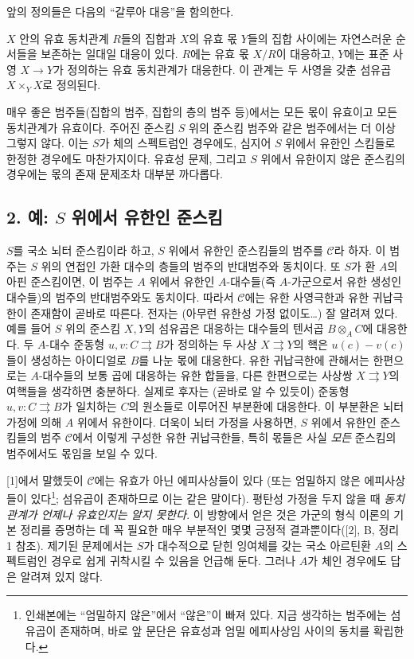 앞의 정의들은 다음의 ``갈루아 대응''을 함의한다.

 $X$ 안의 유효 동치관계 $R$들의 집합과 $X$의 유효
몫 $Y$들의 집합 사이에는 자연스러운 순서들을 보존하는 일대일 대응이
있다. $R$에는 유효 몫 $X/R$이 대응하고, $Y$에는 표준 사영
$X\longrightarrow Y$가 정의하는 유효 동치관계가 대응한다. 이 관계는
두 사영을 갖춘 섬유곱 $X\times_Y X$로 정의된다.

매우 좋은 범주들(집합의 범주, 집합의 층의 범주 등)에서는 모든 몫이
유효이고 모든 동치관계가 유효이다. 주어진 준스킴 $S$ 위의 준스킴
범주와 같은 범주에서는 더 이상 그렇지 않다. 이는 $S$가 체의
스펙트럼인 경우에도, 심지어 $S$ 위에서 유한인 스킴들로 한정한
경우에도 마찬가지이다. 유효성 문제, 그리고 $S$ 위에서 유한이지 않은
준스킴의 경우에는 몫의 존재 문제조차 대부분 까다롭다.

\subsection*{2. 예: $S$ 위에서 유한인 준스킴}

$S$를 국소 뇌터 준스킴이라 하고, $S$ 위에서 유한인 준스킴들의
범주를 $\mathcal C$라 하자. 이 범주는 $S$ 위의 연접인 가환 대수의
층들의 범주의 반대범주와 동치이다. 또 $S$가 환 $A$의 아핀
준스킴이면, 이 범주는 $A$ 위에서 유한인 $A$-대수들(즉 $A$-가군으로서
유한 생성인 대수들)의 범주의 반대범주와도 동치이다. 따라서
$\mathcal C$에는 유한 사영극한과 유한 귀납극한이 존재함이 곧바로
따른다. 전자는 (아무런 유한성 가정 없이도\ldots) 잘 알려져 있다.
예를 들어 $S$ 위의 준스킴 $X,Y$의 섬유곱은 대응하는 대수들의
텐서곱 $B\otimes_A C$에 대응한다. 두 $A$-대수 준동형
$u,v:C\rightrightarrows B$가 정의하는 두 사상
$X\rightrightarrows Y$의 핵은 $u(c)-v(c)$들이 생성하는 아이디얼로
$B$를 나눈 몫에 대응한다. 유한 귀납극한에 관해서는 한편으로는
$A$-대수들의 보통 곱에 대응하는 유한 합들을, 다른 한편으로는
사상쌍 $X\rightrightarrows Y$의 여핵들을 생각하면 충분하다. 실제로
후자는 (곧바로 알 수 있듯이) 준동형
$u,v:C\rightrightarrows B$가 일치하는 $C$의 원소들로 이루어진
부분환에 대응한다. 이 부분환은 뇌터 가정에 의해 $A$ 위에서 유한이다.
더욱이 뇌터 가정을 사용하면, $S$ 위에서 유한인 준스킴들의 범주
$\mathcal C$에서 이렇게 구성한 유한 귀납극한들, 특히 몫들은 사실
\emph{모든} 준스킴의 범주에서도 몫임을 보일 수 있다.

[1]에서 말했듯이 $\mathcal C$에는 유효가 아닌 에피사상들이 있다
(또는 엄밀하지 않은 에피사상들이 있다\footnote{인쇄본에는
``엄밀하지 않은''에서 ``않은''이 빠져 있다. 지금 생각하는 범주에는
섬유곱이 존재하며, 바로 앞 문단은 유효성과 엄밀 에피사상임 사이의
동치를 확립한다.}; 섬유곱이 존재하므로 이는 같은 말이다).
평탄성 가정을 두지 않을 때 \emph{동치관계가 언제나 유효인지는 알지
못한다}. 이 방향에서 얻은 것은 가군의 형식 이론의 기본 정리를
증명하는 데 꼭 필요한 매우 부분적인 몇몇 긍정적 결과뿐이다([2], B,
정리 1 참조). 제기된 문제에서는 $S$가 대수적으로 닫힌 잉여체를 갖는
국소 아르틴환 $A$의 스펙트럼인 경우로 쉽게 귀착시킬 수 있음을
언급해 둔다. 그러나 $A$가 체인 경우에도 답은 알려져 있지 않다.

